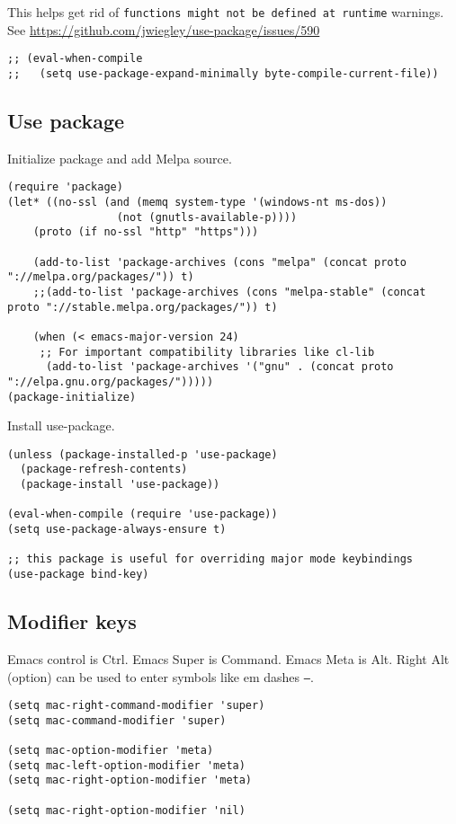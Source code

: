 \documentclass[11pt]{article}
\begin{document}
This helps get rid of \texttt{functions might not be defined at runtime} warnings. See \url{https://github.com/jwiegley/use-package/issues/590}

\begin{verbatim}
;; (eval-when-compile
;;   (setq use-package-expand-minimally byte-compile-current-file))
\end{verbatim}

\subsection{Use package}
\label{sec:org4399e9f}

Initialize package and add Melpa source.

\begin{verbatim}
(require 'package)
(let* ((no-ssl (and (memq system-type '(windows-nt ms-dos))
                 (not (gnutls-available-p))))
    (proto (if no-ssl "http" "https")))

    (add-to-list 'package-archives (cons "melpa" (concat proto "://melpa.org/packages/")) t)
    ;;(add-to-list 'package-archives (cons "melpa-stable" (concat proto "://stable.melpa.org/packages/")) t)

    (when (< emacs-major-version 24)
     ;; For important compatibility libraries like cl-lib
      (add-to-list 'package-archives '("gnu" . (concat proto "://elpa.gnu.org/packages/")))))
(package-initialize)
\end{verbatim}

Install use-package.

\begin{verbatim}
(unless (package-installed-p 'use-package)
  (package-refresh-contents)
  (package-install 'use-package))

(eval-when-compile (require 'use-package))
(setq use-package-always-ensure t)

;; this package is useful for overriding major mode keybindings
(use-package bind-key)
\end{verbatim}

\subsection{Modifier keys}
\label{sec:org29a2a05}

Emacs control is Ctrl. Emacs Super is Command. Emacs Meta is Alt. Right Alt (option) can be used to enter symbols like em dashes \texttt{—}.

\begin{verbatim}
(setq mac-right-command-modifier 'super)
(setq mac-command-modifier 'super)

(setq mac-option-modifier 'meta)
(setq mac-left-option-modifier 'meta)
(setq mac-right-option-modifier 'meta)

(setq mac-right-option-modifier 'nil)
\end{verbatim}
\end{document}
